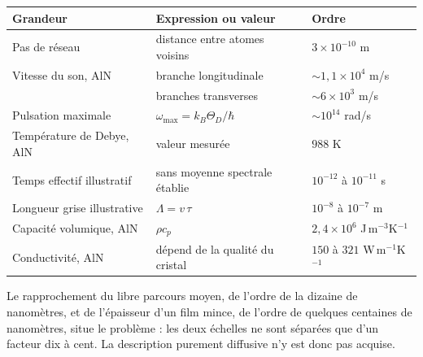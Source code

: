 \documentclass[11pt,a4paper]{article}
\begin{document}
\begin{center}
\begin{tabularx}{\textwidth}{@{}lXl@{}}
\toprule
\textbf{Grandeur} & \textbf{Expression ou valeur} & \textbf{Ordre} \\
\midrule
Pas de réseau & distance entre atomes voisins & $3\times10^{-10}$ m \\
\addlinespace
Vitesse du son, AlN & branche longitudinale & $\sim 1{,}1\times10^{4}$ m/s \\
& branches transverses & $\sim 6\times10^{3}$ m/s \\
\addlinespace
Pulsation maximale & $\omega_{\max} = k_B\Theta_D/\hbar$ & $\sim 10^{14}$ rad/s \\
\addlinespace
Température de Debye, AlN & valeur mesurée & $988$ K \\
\addlinespace
Temps effectif illustratif & sans moyenne spectrale établie & $10^{-12}$ à $10^{-11}$ s \\
\addlinespace
Longueur grise illustrative & $\Lambda = v\,\tau$ & $10^{-8}$ à $10^{-7}$ m \\
\addlinespace
Capacité volumique, AlN & $\rho c_p$ & $2{,}4\times10^{6}$ J\,m$^{-3}$K$^{-1}$ \\
\addlinespace
Conductivité, AlN & dépend de la qualité du cristal & $150$ à $321$ W\,m$^{-1}$K$^{-1}$ \\
\bottomrule
\end{tabularx}
\end{center}

Le rapprochement du libre parcours moyen, de l'ordre de la dizaine de nanomètres, et de l'épaisseur
d'un film mince, de l'ordre de quelques centaines de nanomètres, situe le problème : les deux
échelles ne sont séparées que d'un facteur dix à cent. La description purement diffusive n'y est
donc pas acquise.
\end{document}
